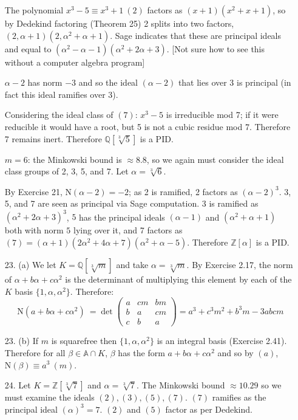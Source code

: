 \documentclass{article}
\newcommand{\Q}[0]{\mathbb{Q}}
\newcommand{\Z}[0]{\mathbb{Z}}
\newcommand{\norm}[0]{\text{N}}
\newcommand{\modequiv}[3]{#1 \equiv #2\ (#3)}
\newcommand{\ringofintegers}[1]{\mathbb{A} \cap #1}
\begin{document}
\begin{enumerate}
    The polynomial $\modequiv{x^3 - 5}{x^3 + 1}{2}$ factors as $(x + 1)(x^2 + x + 1)$, so by Dedekind factoring (Theorem 25) 2 splits into two factors, $(2, \alpha + 1)(2, \alpha^2 + \alpha + 1)$.  Sage indicates that these are principal ideals and equal to $(\alpha^2 - \alpha - 1)(\alpha^2 + 2\alpha + 3)$.  [Not sure how to see this without a computer algebra program]

    $\alpha - 2$ has norm $-3$ and so the ideal $(\alpha - 2)$ that lies over 3 is principal (in fact this ideal ramifies over 3).

    Considering the ideal class of $(7)$: $x^3 - 5$ is irreducible mod 7; if it were reducible it would have a root, but 5 is not a cubic residue mod 7.  Therefore 7 remains inert.  Therefore $\Q[\sqrt[3]{5}]$ is a PID.

    $m = 6$: the Minkowski bound is $\approx 8.8$, so we again must consider the ideal class groups of 2, 3, 5, and 7.  Let $\alpha = \sqrt[3]{6}$.

    By Exercise 21, $\norm(\alpha - 2) = -2$; as 2 is ramified, 2 factors as $(\alpha - 2)^3$.  3, 5, and 7 are seen as principal via Sage computation.  $3$ is ramified as $(\alpha^2 + 2\alpha +3)^3$, $5$ has the principal ideals $(\alpha -1)$ and $(\alpha^2 + \alpha + 1)$ both with norm $5$ lying over it, and 7 factors as $(7) = (\alpha + 1)(2\alpha^2 + 4\alpha + 7)(\alpha^2 + \alpha - 5)$.  Therefore $\Z[\alpha]$ is a PID.

    \item[23. (a)] We let $K = \Q[\sqrt[3]{m}]$ and take $\alpha = \sqrt[3]{m}$.  By Exercise 2.17, the norm of $\alpha + b\alpha + c\alpha^2$ is the determinant of multiplying this element by each of the $K$ basis $\{1, \alpha, \alpha^2\}$.  Therefore:
    \[
        \norm(a + b\alpha + c\alpha^2)\ =\det\left(
        \begin{matrix}
            a & cm &bm \\
            b & a & cm \\
            c & b & a
        \end{matrix}\right) = a^3 + c^3 m^2 + b^3 m - 3abcm
    \]
    \item[23. (b)] If $m$ is squarefree then $\{1, \alpha, \alpha^2\}$ is an integral basis (Exercise 2.41).  Therefore for all $\beta \in \ringofintegers{K}$, $\beta$ has the form $a + b\alpha  + c\alpha^2$ and so by $(a)$, $\modequiv{\norm(\beta)}{a^3}{m}$.

    \item[24.]  Let $K = \Z[\sqrt[3]{7}]$ and $\alpha = \sqrt[3]{7}$.  The Minkowski bound $\approx 10.29$ so we must examine the ideals $(2), (3), (5), (7)$.  $(7)$ ramifies as the principal ideal $(\alpha)^3 = 7$.  $(2)$ and $(5)$ factor as per Dedekind.


\end{enumerate}
\end{document}
